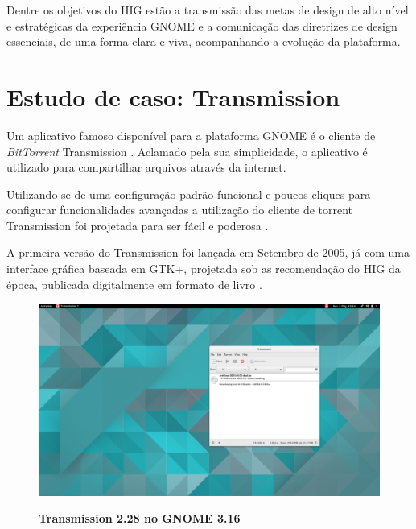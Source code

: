 Dentre os objetivos do HIG estão a transmissão das metas de design de alto nível
e estratégicas da experiência GNOME e a comunicação das diretrizes de design
essenciais, de uma forma clara e viva, acompanhando a evolução da plataforma.

\section{Estudo de caso: Transmission}

Um aplicativo famoso disponível para a plataforma GNOME é o cliente de
\textit{BitTorrent} Transmission \cite{transmission282}. Aclamado pela sua
simplicidade, o aplicativo é utilizado para compartilhar arquivos através da
internet.

Utilizando-se de uma configuração padrão funcional e poucos cliques para
configurar funcionalidades avançadas a utilização do cliente de torrent
Transmission foi projetada para ser fácil e poderosa
\cite{transmission-about}.

A primeira versão do Transmission foi lançada em Setembro de 2005, já com uma
interface gráfica baseada em GTK+, projetada sob as recomendação do HIG
da época, publicada digitalmente em formato de livro \cite{gnome221hig}.

\begin{figure}[!ht]
  \begin{center}
    \caption{\textbf{Transmission 2.28 no GNOME 3.16}}
    \includegraphics [width=\textwidth]{image/transmission/282-master/main-window.png}
    \label{transmission-master}
  \end{center}
\end{figure}
